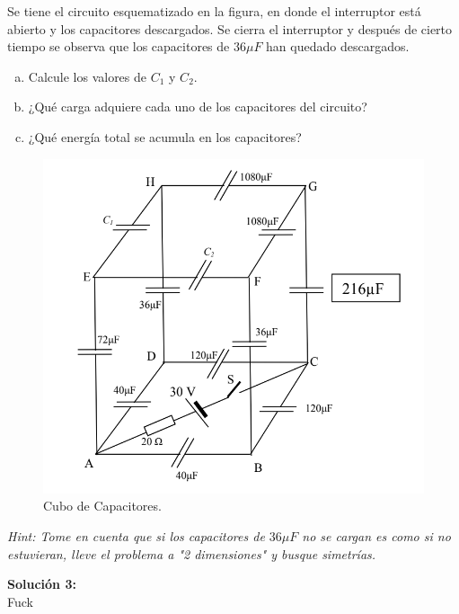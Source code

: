 \begin{mdframed}[style=warning]
	\begin{ejercicio}
		Se tiene el circuito esquematizado en la figura, en donde el interruptor está abierto y los capacitores descargados. Se cierra el interruptor y después de cierto tiempo se observa que los capacitores de $36\mu F$ han quedado descargados.
		\begin{enumerate}[a)]
			\item Calcule los valores de $C_1$ y $C_2$.
			\item ¿Qué carga adquiere cada uno de los capacitores del circuito?
			\item ¿Qué energía total se acumula en los capacitores?
		\end{enumerate}
		\begin{figure}[H]
			\centering
			\includegraphics[scale=0.3]{./img/cubo.png}
			\caption{Cubo de Capacitores.}
			\label{ej3}
		\end{figure}
		\textit{Hint: Tome en cuenta que si los capacitores de $36\mu F$ no se cargan es como si no estuvieran, lleve el problema a "2 dimensiones" y busque simetrías.} \\
	\end{ejercicio}
	\textbf{Solución 3: } \\
	Fuck
\end{mdframed}





